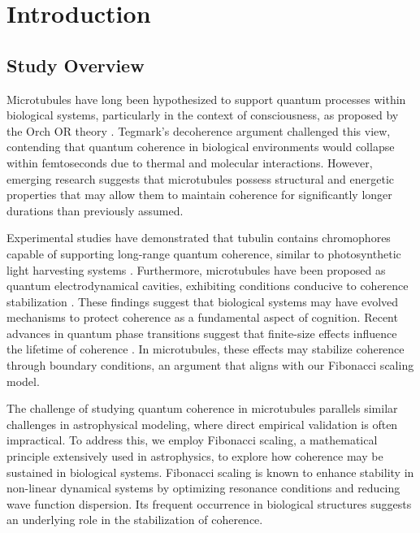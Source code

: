 \section{Introduction}
\subsection{Study Overview}
Microtubules have long been hypothesized to support quantum processes within biological systems, particularly in the context of consciousness, as proposed by the Orch OR theory \cite{hameroff_orchestrated_1996,nanopoulos_quantum_1995}. Tegmark's decoherence argument \cite{tegmark_importance_2000} challenged this view, contending that quantum coherence in biological environments would collapse within femtoseconds due to thermal and molecular interactions. However, emerging research suggests that microtubules possess structural and energetic properties that may allow them to maintain coherence for significantly longer durations than previously assumed.

Experimental studies have demonstrated that tubulin contains chromophores capable of supporting long-range quantum coherence, similar to photosynthetic light harvesting systems \cite{craddock_feasibility_2014}. Furthermore, microtubules have been proposed as quantum electrodynamical cavities, exhibiting conditions conducive to coherence stabilization \cite{mavromatos_quantum_2011}. These findings suggest that biological systems may have evolved mechanisms to protect coherence as a fundamental aspect of cognition. Recent advances in quantum phase transitions suggest that finite-size effects influence the lifetime of coherence \cite{pelissetto_scaling_2023}. In microtubules, these effects may stabilize coherence through boundary conditions, an argument that aligns with our Fibonacci scaling model.

The challenge of studying quantum coherence in microtubules parallels similar challenges in astrophysical modeling, where direct empirical validation is often impractical. To address this, we employ Fibonacci scaling, a mathematical principle extensively used in astrophysics, to explore how coherence may be sustained in biological systems. Fibonacci scaling is known to enhance stability in non-linear dynamical systems by optimizing resonance conditions and reducing wave function dispersion. Its frequent occurrence in biological structures suggests an underlying role in the stabilization of coherence.

